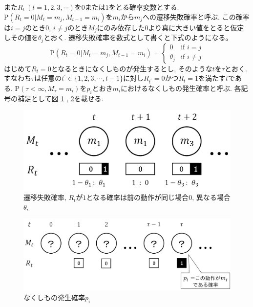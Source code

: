\begin{description}
また$ R_t\ (t=1,2,3,\cdots) $を$ 0 $または$ 1 $をとる確率変数とする. 
$ \mathrm{P}(R_t = 0 | M_t = m_j , M_{t - 1} = m_i) $を$ m_i $から$ m_j $への遷移失敗確率と呼ぶ. 
この確率は$ i = j $のとき$ 0 $, $ i \ne j $のとき$ M_j $にのみ依存した$ 0 $より真に大きい値をとると仮定しその値を$ \theta_j $とおく. %
遷移失敗確率を数式として書くと下式のようになる。
\begin{equation}
    \mathrm{P}(R_t = 0 | M_t = m_j , M_{t - 1} = m_i) =
    \begin{cases}
        0        & \text{if $i = j$}\\
        \theta_j & \text{if $i \ne j$}
    \end{cases}
\end{equation}
はじめて$ R_t = 0 $となるときになくしものが発生するとし, そのような$ t $を$ \tau $とおく. 
すなわち$ \tau $は任意の$ t^{\prime} \in \{1,2,3,\cdots,t-1\} $に対し$ R_{t^{\prime}} = 0 $かつ$ R_t = 1 $を満たす$ t $である. 
$ \mathrm{P}(\tau < \infty , M_{\tau} = m_i) $を$ p_i $とおき$ m_i $におけるなくしもの発生確率と呼ぶ. 
各記号の補足として図 \ref{fig:r} , \ref{fig:p}を載せる. 

\begin{figure}[H]
    \begin{center}
    \includegraphics[width=0.8\linewidth]{figs/miss_prob.png}
    \caption{遷移失敗確率, $R_t$が$1$となる確率は前の動作が同じ場合$0$, 異なる場合$\theta_i$}
    \label{fig:r}
    \end{center}
\end{figure}

\begin{figure}[H]
    \begin{center}
    \includegraphics[width=1.0\linewidth]{figs/lost_prob.png}
    \caption{なくしもの発生確率$p_i$}
    \label{fig:p}
    \end{center}
\end{figure}


\end{description}

